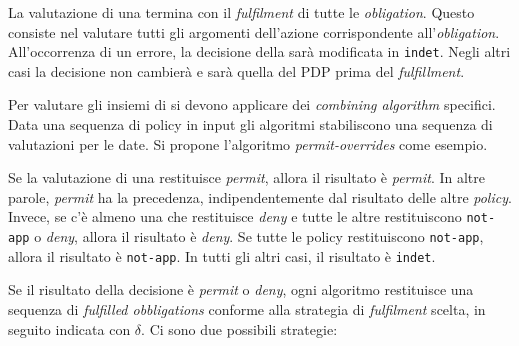 La valutazione di una \epolicy termina con il \emph{fulfilment} di tutte le \emph{obligation}. Questo consiste nel valutare
tutti gli argomenti dell'azione corrispondente all'\emph{obligation}. All'occorrenza di un errore, la decisione della \epolicy
sarà modificata in \texttt{indet}.
Negli altri casi la decisione non cambierà e sarà quella del \ac{PDP} prima del \emph{fulfillment}.\par
Per valutare gli insiemi di \epolicy si devono applicare dei \emph{combining algorithm} specifici. Data una sequenza di
policy in input gli algoritmi stabiliscono una sequenza di valutazioni per le \epolicy date. Si propone l'algoritmo
\emph{permit-overrides} come esempio.
\begin{description}[labelindent=5pt,style=multiline,leftmargin=3cm]
\item[permit-overrides]
                        Se la valutazione di una \epolicy restituisce \emph{permit}, allora il risultato è \emph{permit}.
                        In altre parole, \emph{permit} ha la precedenza, indipendentemente dal risultato delle altre \emph{policy}.
                        Invece, se c'è almeno una \epolicy che restituisce \emph{deny} e tutte le altre restituiscono
                        \texttt{not-app} o \emph{deny}, allora il risultato è \emph{deny}. Se tutte le policy restituiscono
                        \texttt{not-app}, allora il risultato è \texttt{not-app}. In tutti gli altri casi, il risultato è \texttt{indet}.
\end{description}
Se il risultato della decisione è \emph{permit} o \emph{deny}, ogni algoritmo restituisce una sequenza di \emph{fulfilled obbligations}
conforme alla strategia di \emph{fulfilment} scelta, in seguito indicata con $\delta$. Ci sono due possibili strategie:

